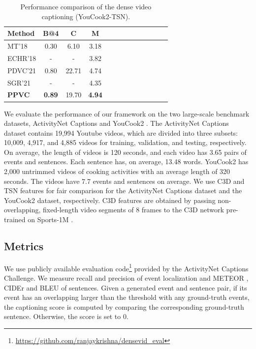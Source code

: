 \begin{table}[tp]
  \centering
  \caption{
    Performance comparison of the dense video captioning (YouCook2-TSN).
  }
  \begin{tabular}{@{}l|c|c|cccc|ccccc|c@{}}
    \hline
    Method &  B@4 & C &  M \\
    \hline
    MT'18 \cite{zhou2018end} & 0.30 &  6.10 &  3.18 \\
    ECHR'18 \cite{wang2018bidirectional} & - & - &  3.82 \\
    PDVC'21 \cite{wang2021end} &  0.80 &  22.71 &  4.74 \\
    SGR'21 \cite{deng2021sketch} & - &  - &  4.35 \\
    \textbf{PPVC} &  \textbf{0.89} &  19.70 &  \textbf{4.94} \\
    \hline
  \end{tabular}
  \label{tab:eval_captioner_yc2}
\end{table}

We evaluate the performance of our framework on the two large-scale benchmark datasets, ActivityNet Captions \cite{krishna2017dense} and YouCook2 \cite{zhou2018towards}.
The ActivityNet Captions dataset contains 19,994 Youtube videos, which are divided into three subsets: 10,009, 4,917, and 4,885 videos for training, validation, and testing, respectively.
On average, the length of videos is 120 seconds, and each video has 3.65 pairs of events and sentences.
Each sentence has, on average, 13.48 words.
YouCook2 has 2,000 untrimmed videos of cooking activities with an average length of 320 seconds.
The videos have 7.7 events and sentences on average.
We use C3D \cite{tran2015learning} and TSN \cite{wang2018temporal} features for fair comparison for the ActivityNet Captions dataset and the YouCook2 dataset, respectively.
C3D features are obtained by passing non-overlapping, fixed-length video segments of 8 frames to the C3D network pre-trained on Sports-1M \cite{karpathy2014large}.

\subsection{Metrics}
\label{subsec:experiments-metrics}

We use publicly available evaluation code\footnote{\url{https://github.com/ranjaykrishna/densevid_eval}} provided by the ActivityNet Captions Challenge.
We measure recall and precision of event localization and METEOR \cite{banerjee2005meteor}, CIDEr \cite{vedantam2015cider} and BLEU \cite{papineni2002bleu} of sentences.
Given a generated event and sentence pair, if its event has an overlapping larger than the threshold with any ground-truth events, the captioning score is computed by comparing the corresponding ground-truth sentence.
Otherwise, the score is set to 0.


